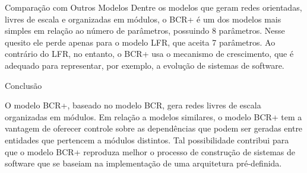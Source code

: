 \begin{section}{Comparação com Outros Modelos}
	Dentre os modelos que geram redes orientadas, livres de escala e organizadas em módulos, o BCR+ é um dos modelos mais simples em relação ao número de parâmetros, possuindo 8 parâmetros. Nesse quesito ele perde apenas para o modelo LFR, que aceita 7 parâmetros. Ao contrário do LFR, no entanto, o BCR+ usa o mecanismo de crescimento, que é adequado para representar, por exemplo, a evolução de sistemas de software.


	
\end{section}

\begin{section}{Conclusão}
	
	O modelo BCR+, baseado no modelo BCR, gera redes livres de escala organizadas em módulos. Em relação a modelos similares, o modelo BCR+ tem a vantagem de oferecer controle sobre as dependências que podem ser geradas entre entidades que pertencem a módulos distintos. Tal possibilidade contribui para que o modelo BCR+ reproduza melhor o processo de construção de sistemas de software que se baseiam na implementação de uma arquitetura pré-definida.
	
\end{section}